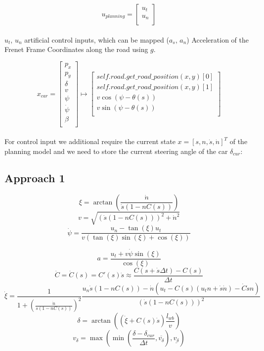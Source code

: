 \[
	u_{planning} = \begin{bmatrix}
		u_t \\
		u_n \\
	\end{bmatrix}
\]
\\
$u_t$, $u_n$ artificial control inputs, which can be mapped ($a_{s}$, $a_{n}$) Acceleration of the Frenet Frame Coordinates along the road using $g$.

\[
	x_{car} = \begin{bmatrix}
		p_x        \\
		p_y        \\
		\delta     \\
		v          \\
		\psi       \\
		\dot{\psi} \\
		\beta      \\
	\end{bmatrix} \mapsto \begin{bmatrix}
		self.road.get\_road\_position(x, y)[0] \\
		self.road.get\_road\_position(x, y)[1] \\
		v \cos(\psi - \theta(s))               \\
		v \sin(\psi - \theta(s))               \\
	\end{bmatrix}
\]
\\
For control input we additional require the current state $x = [s, n, \dot{s}, \dot{n}]^T$ of the planning model and we need to store the current steering angle of the car $\delta_{cur}$:

\subsection{Approach 1}

\[
	\xi = \arctan(\frac{\dot{n}}{\dot{s} (1 - n C(s))})
\]
\[
	v = \sqrt{(\dot{s} (1 - n C(s)))^2 + \dot{n}^2}
\]
\[
	\dot{\psi} = \frac{u_n - \tan(\xi) u_t}{v (\tan(\xi) \sin(\xi) + \cos(\xi))}
\]

\[
	a = \frac{u_t + v \dot{\psi} \sin(\xi)}{\cos(\xi)}
\]
\[
	\dot{C} = \dot{C}(s) = C'(s)\dot{s} \approx \frac{C(s + \dot{s} \Delta t) - C(s)}{\Delta t}
\]
\[
	\dot{\xi} = \frac{1}{1 + (\frac{\dot{n}}{\dot{s} (1 - n C(s))})^2} \frac{u_n \dot{s} (1 - n C(s)) - \dot{n} (u_t - C(s) (u_t n + \dot{s} \dot{n}) - \dot{C} \dot{s} n)}{(\dot{s} (1 - n C(s)))^2}
\]
\[
	\delta = \arctan((\dot{\xi} + C(s) \dot{s}) \frac{l_{wb}}{v})
\]
\[
	v_\delta = \max(\min(\frac{\delta - \delta_{cur}}{\Delta t}, \overline{v_\delta}), \underline{v_\delta})
\]

